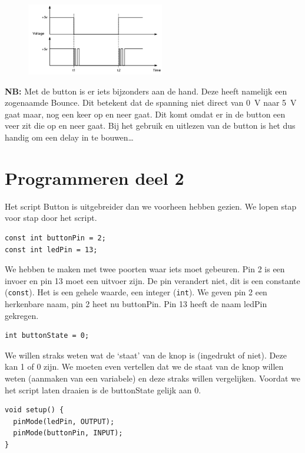 \documentclass{arduino}
\begin{document}
\begin{figure}
\raggedleft
\includegraphics[width=6cm]{16. Button bounce}
\end{figure}

\textbf{NB:} Met de button is er iets bijzonders aan de hand. Deze heeft namelijk een zogenaamde Bounce. Dit betekent dat de spanning niet direct van \SI{0}{\volt} naar \SI{5}{\volt} gaat maar, nog een keer op en neer gaat. Dit komt omdat er in de button een veer zit die op en neer gaat. Bij het gebruik en uitlezen van de button is het dus handig om een delay in te bouwen\dots

\section{Programmeren deel 2}

Het script Button is uitgebreider dan we voorheen hebben gezien. We lopen stap voor stap door het script.

\begin{lstlisting}
const int buttonPin = 2;
const int ledPin = 13;
\end{lstlisting}

We hebben te maken met twee poorten waar iets moet gebeuren. Pin 2 is een invoer en pin 13 moet een uitvoer zijn. De pin verandert niet, dit is een constante (\lstinline{const}). Het is een gehele waarde, een integer (\lstinline{int}). We geven pin 2 een herkenbare naam, pin 2 heet nu buttonPin. Pin 13 heeft de naam ledPin gekregen.

\begin{lstlisting}
int buttonState = 0;
\end{lstlisting}

We willen straks weten wat de ‘staat’ van de knop is (ingedrukt of niet). Deze kan 1 of 0 zijn. We moeten even vertellen dat we de staat van de knop willen weten (aanmaken van een variabele) en deze straks willen vergelijken. Voordat we het script laten draaien is de buttonState gelijk aan 0.

\begin{lstlisting}
void setup() {
  pinMode(ledPin, OUTPUT);
  pinMode(buttonPin, INPUT);
}
\end{lstlisting}
\end{document}
